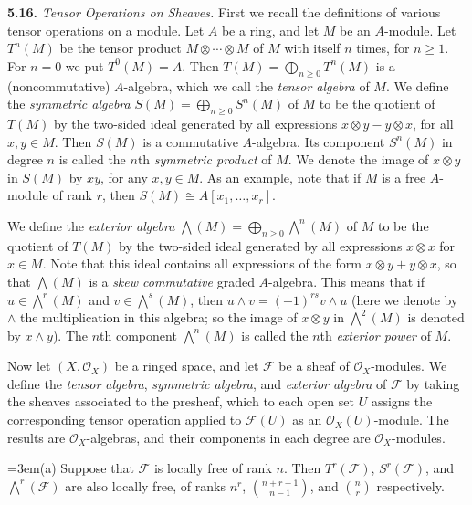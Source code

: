 {\smallskip
\noindent\hypertarget{ex-II-5.16}{}\textbf{5.16.} \emph{Tensor Operations on Sheaves.} First we recall the definitions of various tensor operations on a module. Let $A$ be a ring, and let $M$ be an $A$-module. Let $T^n(M)$ be the tensor product $M\otimes\cdots\otimes M$ of $M$ with itself $n$ times, for $n\ge1$. For $n=0$ we put $T^0(M)=A$. Then $T(M)=\bigoplus_{n\ge0}T^n(M)$ is a (noncommutative) $A$-algebra, which we call the \emph{tensor algebra} of $M$. We define the \emph{symmetric algebra} $S(M)=\bigoplus_{n\ge0}S^n(M)$ of $M$ to be the quotient of $T(M)$ by the two-sided ideal generated by all expressions $x\otimes y-y\otimes x$, for all $x,y\in M$. Then $S(M)$ is a commutative $A$-algebra. Its component $S^n(M)$ in degree $n$ is called the $n$th \emph{symmetric product} of $M$. We denote the image of $x\otimes y$ in $S(M)$ by $xy$, for any $x,y\in M$. As an example, note that if $M$ is a free $A$-module of rank $r$, then $S(M)\cong A[x_1,\ldots,x_r]$.

We define the \emph{exterior algebra} $\bigwedge(M)=\bigoplus_{n\ge0}\bigwedge^n(M)$ of $M$ to be the quotient of $T(M)$ by the two-sided ideal generated by all expressions $x\otimes x$ for $x\in M$. Note that this ideal contains all expressions of the form $x\otimes y+y\otimes x$, so that $\bigwedge(M)$ is a \emph{skew commutative} graded $A$-algebra. This means that if $u\in\bigwedge^r(M)$ and $v\in\bigwedge^s(M)$, then $u\wedge v=(-1)^{rs}v\wedge u$ (here we denote by $\wedge$ the multiplication in this algebra; so the image of $x\otimes y$ in $\bigwedge^2(M)$ is denoted by $x\wedge y$). The $n$th component $\bigwedge^n(M)$ is called the $n$th \emph{exterior power} of $M$.

Now let $(X,\mathcal O_X)$ be a ringed space, and let $\mathcal F$ be a sheaf of $\mathcal O_X$-modules. We define the \emph{tensor algebra}, \emph{symmetric algebra}, and \emph{exterior algebra} of $\mathcal F$ by taking the sheaves associated to the presheaf, which to each open set $U$ assigns the corresponding tensor operation applied to $\mathcal F(U)$ as an $\mathcal O_X(U)$-module. The results are $\mathcal O_X$-algebras, and their components in each degree are $\mathcal O_X$-modules.

\noindent\hangindent=3em\hspace*{1.7em}(a) Suppose that $\mathcal F$ is locally free of rank $n$. Then $T^r(\mathcal F)$, $S^r(\mathcal F)$, and $\bigwedge^r(\mathcal F)$ are also locally free, of ranks $n^r$, $\binom{n+r-1}{n-1}$, and $\binom nr$ respectively.

}
